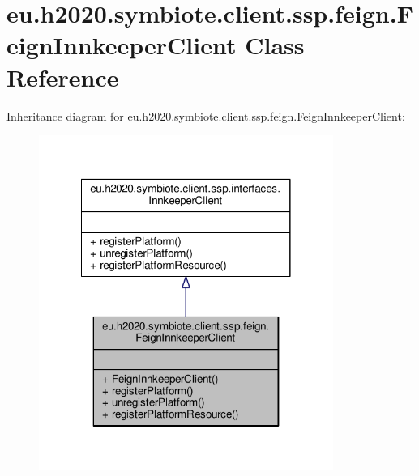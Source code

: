 \hypertarget{classeu_1_1h2020_1_1symbiote_1_1client_1_1ssp_1_1feign_1_1FeignInnkeeperClient}{}\section{eu.\+h2020.\+symbiote.\+client.\+ssp.\+feign.\+Feign\+Innkeeper\+Client Class Reference}
\label{classeu_1_1h2020_1_1symbiote_1_1client_1_1ssp_1_1feign_1_1FeignInnkeeperClient}


Inheritance diagram for eu.\+h2020.\+symbiote.\+client.\+ssp.\+feign.\+Feign\+Innkeeper\+Client\+:
\nopagebreak
\begin{figure}[H]
\begin{center}
\leavevmode
\includegraphics[width=272pt]{classeu_1_1h2020_1_1symbiote_1_1client_1_1ssp_1_1feign_1_1FeignInnkeeperClient__inherit__graph}
\end{center}
\end{figure}


